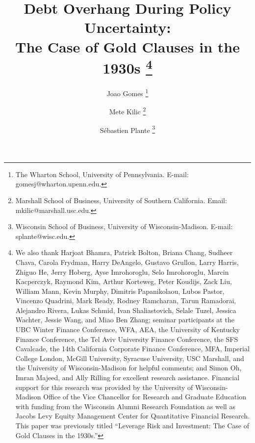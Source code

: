 \begin{titlepage} 
\title{{ \large \textbf{Debt Overhang During Policy Uncertainty: \\  The Case of Gold Clauses in the 1930s}\!\!}
\thanks{ We also thank Harjoat Bhamra, Patrick Bolton, Briana Chang, Sudheer Chava, Carola Frydman, Harry DeAngelo, Gustavo Grullon, Larry Harris, Zhiguo He, Jerry Hoberg, Ayse Imrohoroglu, Selo Imrohoroglu, Marcin Kacperczyk, Raymond Kim, Arthur Korteweg, Peter Koudijs, Zack Liu, William Mann, Kevin Murphy, Dimitris Papanikolaou, Lubos Pastor, Vincenzo Quadrini, Mark Ready, Rodney Ramcharan, Tarun Ramadorai, Alejandro Rivera, Lukas Schmid, Ivan Shaliastovich, Selale Tuzel, Jessica Wachter, Jessie Wang, and Miao Ben Zhang; seminar participants at the UBC Winter Finance Conference, WFA, AEA, the University of Kentucky Finance Conference, the Tel Aviv University Finance Conference, the SFS Cavalcade, the 14th California Corporate Finance Conference, MFA, Imperial College London, McGill University, Syracuse University, USC Marshall, and the University of Wisconsin-Madison for helpful comments; and Simon Oh, Imran Majeed, and Ally Rilling for excellent research assistance. Financial support for this research was provided by the University of Wisconsin-Madison Office of the Vice Chancellor for Research and Graduate Education with funding from the Wisconsin Alumni Research Foundation as well as Jacobs Levy Equity Management Center for Quantitative Financial Research. This paper was previously titled ``Leverage Risk and Investment: The Case of Gold Clauses in the 1930s.''}\vspace*{4mm}}

\author{Joao Gomes 
\footnote{The Wharton School, University of Pennsylvania. E-mail: gomesj@wharton.upenn.edu.} \\
\and 
Mete Kilic 
\footnote{Marshall School of Business, University of Southern California. Email: mkilic@marshall.usc.edu.}
\and 
S\'ebastien Plante
\footnote{Wisconsin School of Business, University of Wisconsin-Madison. E-mail: splante@wisc.edu.} \vspace*{10mm}}


\makeatletter
\let\Hy@WarnOptionDisabled\@gobble
\makeatother
\hypersetup{pageanchor=false}
\maketitle
\thispagestyle{empty}
\hypersetup{pageanchor=true}


\end{titlepage}
